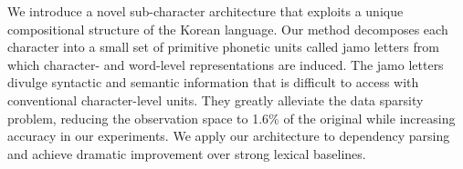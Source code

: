 We introduce a novel sub-character architecture that exploits a unique compositional structure of the Korean language. Our method decomposes each character into a small set of primitive phonetic units called jamo letters from which character- and word-level representations are induced. The jamo letters divulge syntactic and semantic information that is difficult to access with conventional character-level units. They greatly alleviate the data sparsity problem, reducing the observation space to 1.6\% of the original while increasing accuracy in our experiments. We apply our architecture to dependency parsing and achieve dramatic improvement over strong lexical baselines.

